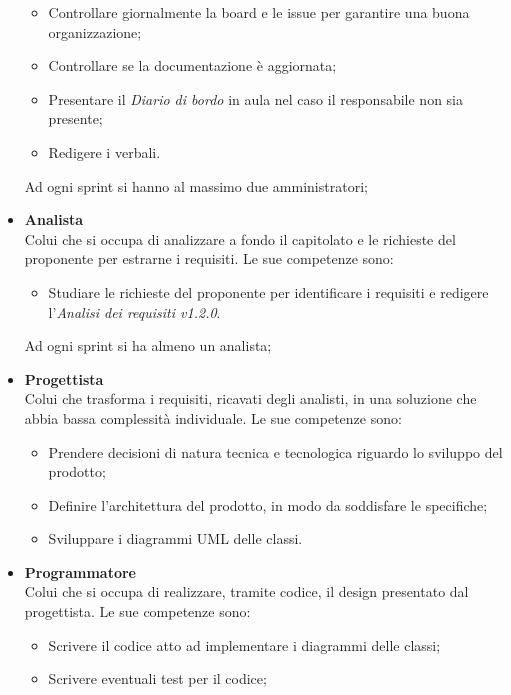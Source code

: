 \begin{itemize}
\begin{itemize}
              \item Controllare giornalmente la board e le issue per garantire una buona
                    organizzazione;
              \item Controllare se la documentazione è aggiornata;
              \item Presentare il \textit{Diario di bordo} in aula nel caso il responsabile non sia
                    presente;
              \item Redigere i verbali.
          \end{itemize}
          Ad ogni sprint si hanno al massimo due amministratori;
    \item \textbf{Analista}\\
          Colui che si occupa di analizzare a fondo il capitolato e le richieste del proponente per estrarne i requisiti.
          Le sue competenze sono:
          \begin{itemize}
              \item Studiare le richieste del proponente per identificare i requisiti e redigere
                    l'\textit{Analisi dei requisiti v1.2.0}.
          \end{itemize}
          Ad ogni sprint si ha almeno un analista;
    \item \textbf{Progettista}\\
          Colui che trasforma i requisiti, ricavati degli analisti, in una soluzione che abbia bassa complessità individuale.
          Le sue competenze sono:
          \begin{itemize}
              \item Prendere decisioni di natura tecnica e tecnologica riguardo lo sviluppo del
                    prodotto;
              \item Definire l'architettura del prodotto, in modo da soddisfare le specifiche;
              \item Sviluppare i diagrammi UML delle classi.
          \end{itemize}
    \item \textbf{Programmatore}\\
          Colui che si occupa di realizzare, tramite codice, il design presentato dal progettista.
          Le sue competenze sono:
          \begin{itemize}
              \item Scrivere il codice atto ad implementare i diagrammi delle classi;
              \item Scrivere eventuali test per il codice;

\end{itemize}
\end{itemize}
